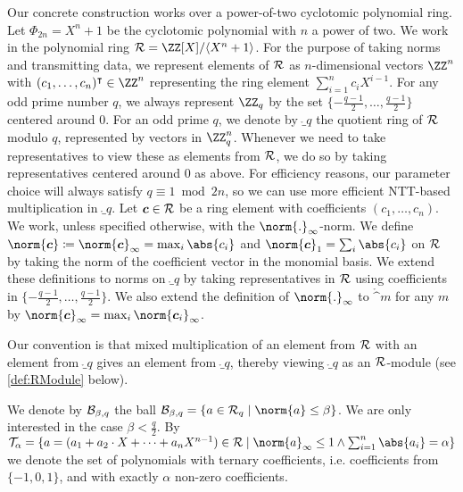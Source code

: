 Our concrete construction works over a power-of-two cyclotomic polynomial ring.
Let $\Phi_{2n} = X^n+1$ be the cyclotomic polynomial with $n$ a power of two. 
We work in the polynomial ring $\ring =  \defring$. For the purpose of taking norms and transmitting data, we represent elements of $\mathcal{R}$ as $n$-dimensional vectors $\ZZ^n$ with $(c_1,\dots,c_{n})^\transpose\in \ZZ^n$ representing the ring element $\sum_{i=1}^{n} c_{i} X^{i-1}$.
For any odd prime number $q$, we always represent $\ZZ_q$ by the set $\{-\tfrac{q-1}{2},\ldots,\tfrac{q-1}{2}\}$ centered around 0.
For an odd prime $q$, we denote by $\ring_q$ the quotient ring of $\mathcal{R}$ modulo $q$, represented by vectors in $\ZZ_q^n$. Whenever we need to take representatives to view these as elements from $\mathcal{R}$, we do so by taking representatives centered around 0 as above. For efficiency reasons, our parameter choice will always satisfy $q \equiv 1 \bmod 2n$, so we can use more efficient NTT-based multiplication in $\ring_q$.
Let $\boldsymbol{c} \in \mathcal{R}$ be a ring element with coefficients $(c_1,\ldots, c_{n})$.
We work, unless specified otherwise, with the $\norm{.}_\infty$-norm.
We define $\norm{\vec{c}}\coloneqq\norm{\vec{c}}_\infty = \max_{i}\abs{c_i}$ and $\norm{\vec{c}}_1 = \sum_{i}\abs{c_i}$ on $\mathcal{R}$ by taking the norm of the coefficient vector in the monomial basis.
We extend these definitions to norms on $\ring_q$ by taking representatives in $\mathcal{R}$ using coefficients in $\{-\tfrac{q-1}{2},\ldots,\tfrac{q-1}{2}\}$.
We also extend the definition of $\norm{.}_\infty$ to $\ring^m$ for any $m$ by $\norm{\vec{c}}_{\infty}= \max_i\norm{\vec{c}_i}_\infty$.

Our convention is that mixed multiplication of an element from $\mathcal{R}$ with an element from $\ring_q$ gives an element from $\ring_q$, thereby viewing $\ring_q$ as an $\mathcal{R}$-module (see \autoref{def:RModule} below).

We denote by $\mathcal{B}_{\beta, q}$ the ball $\ball{\beta}{q} = \{a\in\ring_q\mid \norm{a}\leq\beta\}$. We are only interested in the case $\beta < \tfrac{q}{2}$.
By 
\(
\tern_\alpha = \{a=(a_1+a_2\cdot X + \dots + a_{n}X^{n-1}) \in\ring \mid \norm{a}_\infty\leq 1 \land \sum_{i=1}^{n} \abs{a_i} = \alpha\}
\) %
we denote the set of polynomials with ternary coefficients, i.e. coefficients from $\{-1,0,1\}$, and with exactly $\alpha$ non-zero coefficients.


